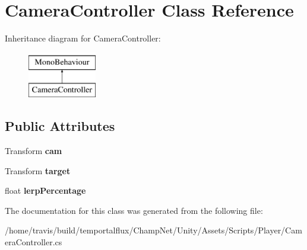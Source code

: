 \hypertarget{class_camera_controller}{\section{Camera\-Controller Class Reference}
\label{class_camera_controller}
}
Inheritance diagram for Camera\-Controller\-:\begin{figure}[H]
\begin{center}
\leavevmode
\includegraphics[height=2.000000cm]{class_camera_controller}
\end{center}
\end{figure}
\subsection*{Public Attributes}
\begin{DoxyCompactItemize}
\item 
\hypertarget{class_camera_controller_ac1525290b1ff45e8911b5c35cd869d66}{Transform {\bfseries cam}}\label{class_camera_controller_ac1525290b1ff45e8911b5c35cd869d66}

\item 
\hypertarget{class_camera_controller_a0a48b454b4a2bb8dbfc08e64b8c3e8e6}{Transform {\bfseries target}}\label{class_camera_controller_a0a48b454b4a2bb8dbfc08e64b8c3e8e6}

\item 
\hypertarget{class_camera_controller_a278961a2872dad91443d5dac07c30a2f}{float {\bfseries lerp\-Percentage}}\label{class_camera_controller_a278961a2872dad91443d5dac07c30a2f}

\end{DoxyCompactItemize}


The documentation for this class was generated from the following file\-:\begin{DoxyCompactItemize}
\item 
/home/travis/build/temportalflux/\-Champ\-Net/\-Unity/\-Assets/\-Scripts/\-Player/Camera\-Controller.\-cs\end{DoxyCompactItemize}
